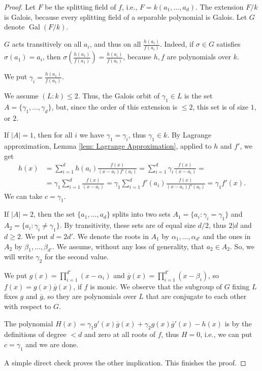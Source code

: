 \documentclass[10pt,a4paper]{amsart}
\newcommand{\op}{\operatorname}
\begin{document}
\begin{proof}
    Let $F$ be the splitting field of $f$, i.e., $F=k(a_1,\ldots,a_d)$. The extension $F/k$ is Galois, because every splitting field of a separable polynomial is Galois. Let $G$ denote $\op{Gal}(F/k)$.

    $G$ acts transitively on all $a_i$, and thus on all $\frac{h(a_i)}{f(a_i)}$. Indeed, if $\sigma\in G$ satisfies $\sigma(a_1)=a_i$, then $\sigma(\frac{h(a_1)}{f(a_1)})=\frac{h(a_i)}{f(a_i)}$, because $h,f$ are polynomials over $k$.

    We put $\gamma_i=\frac{h(a_1)}{f(a_1)}$.
    
    We assume $(L:k)\le 2$. Thus, the Galois orbit of $\gamma_1\in L$ is the set $A=\{\gamma_1,\ldots,\gamma_d\}$, but, since the order of this extension is $\le 2$, this set is of size $1$, or $2$.

    If $|A|=1$, then for all $i$ we have $\gamma_1=\gamma_i$, thus $\gamma_1\in k$. By Lagrange approximation, Lemma \ref{lem: Lagrange Approximation}, applied to $h$ and $f'$, we get
    \begin{align*}
     h(x)&=\sum_{i=1}^d h(a_i)\frac{f(x)}{(x-a_i)f'(a_i)}=\sum_{i=1}^d \gamma_i\frac{f(x)}{(x-a_i)}=\\
     &=\gamma_1\sum_{i=1}^d \frac{f(x)}{(x-a_i)}=\gamma_1\sum_{i=1}^d f'(a_i)\frac{f(x)}{(x-a_i)f'(a_i)}=\gamma_1f'(x).
    \end{align*}
    We can take $c=\gamma_1$.

    If $|A|=2$, then the set $\{a_1,\ldots,a_d\}$ splits into two sets $A_1=\{a_i: \gamma_i=\gamma_1\}$ and $A_2=\{a_i: \gamma_i\ne\gamma_1\}$. By transitivity, these sets are of equal size $d/2$, thus $2|d$ and $d\ge 2$. We put $d=2d'$. We denote the roots in $A_1$ by $\alpha_1,\ldots,\alpha_{d'}$ and the ones in $A_2$ by $\beta_1,\ldots,\beta_{d'}$. We assume, without any loss of generality, that $a_2\in A_2$. So, we will write $\gamma_2$ for the second value.
    
    We put $g(x)=\prod_{i=1}^{d'}(x-\alpha_i)$ and $\overline{g}(x)=\prod_{i=1}^{d'}(x-\beta_i)$, so $f(x)=g(x)\overline{g}(x)$, if $f$ is monic. We observe that the subgroup of $G$ fixing $L$ fixes $g$ and $\overline{g}$, so they are polynomials over $L$ that are conjugate to each other with respect to $G$.

    The polynomial $H(x)=\gamma_1 g'(x)\overline{g}(x)+\gamma_2 g(x)\overline{g}'(x)-h(x)$ is by the definitions of degree $<d$ and zero at all roots of $f$, thus $H=0$, i.e., we can put $c=\gamma_1$ and we are done.

    A simple direct check proves the other implication. 
    This finishes the proof.
\end{proof}
\end{document}
